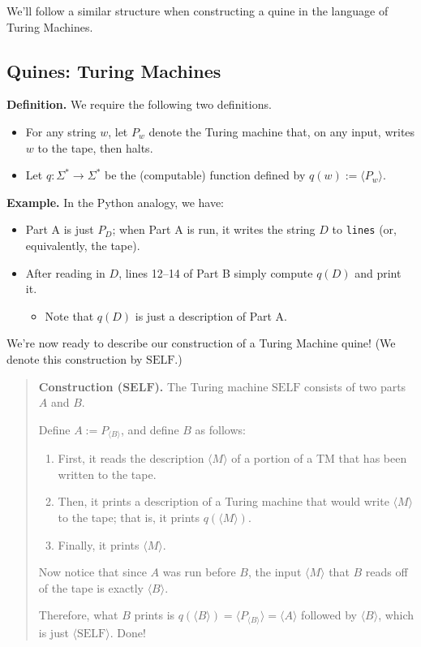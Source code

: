 We'll follow a similar structure
when constructing a quine in the language of Turing Machines.

\subsection{Quines: Turing Machines}

\textbf{Definition.}
We require the following two definitions.
\begin{itemize}
    \item For any string $w$,
    let $P_w$ denote the Turing machine that, on any input,
    writes $w$ to the tape, then halts.
    \item Let $q \colon \Sigma^* \to \Sigma^*$ be the (computable) function
    defined by $q(w) := \langle P_w \rangle$.
\end{itemize}

\textbf{Example.}
In the Python analogy, we have:
\begin{itemize}
    \item Part A is just $P_D$;
    when Part A is run, it writes the string $D$
    to \texttt{lines} (or, equivalently, the tape).
    \item After reading in $D$, lines 12–14 of Part B
    simply compute $q(D)$ and print it.
    \begin{itemize}
        \item Note that $q(D)$ is just a description of Part A.
    \end{itemize}
\end{itemize}

We're now ready to describe our construction of
a Turing Machine quine!
(We denote this construction by $\mathrm{SELF}$.)

\begin{quote}
    \textbf{Construction ($\mathbf{SELF}$).}
    The Turing machine $\mathrm{SELF}$ consists of two parts
    $A$ and $B$.
    
    Define $A := P_{\langle B \rangle}$,
    and define $B$ as follows:
    \begin{enumerate}
        \item First, it reads the description $\langle M \rangle$
        of a portion of a TM that has been written to the tape.
        \item Then, it prints a description of a Turing machine
        that would write $\langle M \rangle$ to the tape;
        that is, it prints $q(\langle M \rangle)$.
        \item Finally, it prints $\langle M \rangle$.
    \end{enumerate}
    Now notice that since $A$ was run before $B$,
    the input $\langle M \rangle$ that $B$ reads off of the tape
    is exactly $\langle B \rangle$.

    Therefore, what $B$ prints is $q(\langle B \rangle)
    = \langle P_{\langle B \rangle} \rangle = \langle A \rangle$
    followed by $\langle B \rangle$,
    which is just $\langle \mathrm{SELF} \rangle$.  Done!
\end{quote}

